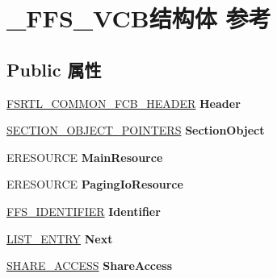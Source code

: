 \hypertarget{struct___f_f_s___v_c_b}{}\section{\+\_\+\+F\+F\+S\+\_\+\+V\+C\+B结构体 参考}
\label{struct___f_f_s___v_c_b}
\subsection*{Public 属性}
\begin{DoxyCompactItemize}
\item 
\mbox{\label{struct___f_f_s___v_c_b_ad198ff96d062e12ee6297b310487033d}} 
\hyperlink{struct___f_s_r_t_l___c_o_m_m_o_n___f_c_b___h_e_a_d_e_r}{F\+S\+R\+T\+L\+\_\+\+C\+O\+M\+M\+O\+N\+\_\+\+F\+C\+B\+\_\+\+H\+E\+A\+D\+ER} {\bfseries Header}
\item 
\mbox{\label{struct___f_f_s___v_c_b_aaac2bd1332d179dc1dddd2d167b30afe}} 
\hyperlink{struct___s_e_c_t_i_o_n___o_b_j_e_c_t___p_o_i_n_t_e_r_s}{S\+E\+C\+T\+I\+O\+N\+\_\+\+O\+B\+J\+E\+C\+T\+\_\+\+P\+O\+I\+N\+T\+E\+RS} {\bfseries Section\+Object}
\item 
\mbox{\label{struct___f_f_s___v_c_b_ad2ebb0d088f6e0c985a95d5bc74d66b2}} 
E\+R\+E\+S\+O\+U\+R\+CE {\bfseries Main\+Resource}
\item 
\mbox{\label{struct___f_f_s___v_c_b_abe1b6a5af2a4bdb92c89b516fccc5f7f}} 
E\+R\+E\+S\+O\+U\+R\+CE {\bfseries Paging\+Io\+Resource}
\item 
\mbox{\label{struct___f_f_s___v_c_b_ad5ca5075f119b21ca73eb8930c19e298}} 
\hyperlink{struct___f_f_s___i_d_e_n_t_i_f_i_e_r}{F\+F\+S\+\_\+\+I\+D\+E\+N\+T\+I\+F\+I\+ER} {\bfseries Identifier}
\item 
\mbox{\label{struct___f_f_s___v_c_b_a176ea7f6ce63aa6bcfbbc04fe8cbf8ec}} 
\hyperlink{struct___l_i_s_t___e_n_t_r_y}{L\+I\+S\+T\+\_\+\+E\+N\+T\+RY} {\bfseries Next}
\item 
\mbox{\label{struct___f_f_s___v_c_b_ac7963330085a79fcbad040c3ea697420}} 
\hyperlink{struct___s_h_a_r_e___a_c_c_e_s_s}{S\+H\+A\+R\+E\+\_\+\+A\+C\+C\+E\+SS} {\bfseries Share\+Access}

\end{DoxyCompactItemize}
